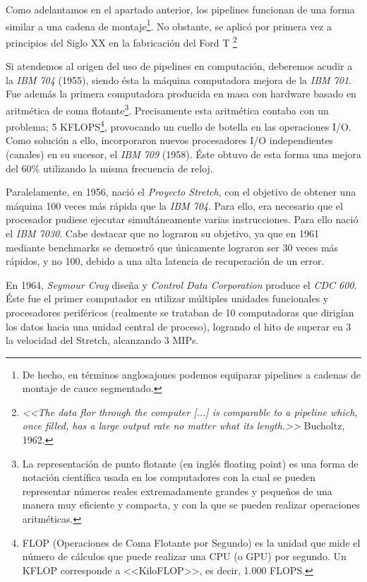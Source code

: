 \documentclass[a4paper, 11pt, titlepage]{article}
\begin{document}
    Como adelantamos en el apartado anterior, los pipelines funcionan de una forma similar a una cadena
    de montaje\footnote{
        De hecho, en términos anglosajones podemos equiparar pipelines a cadenas de montaje de cauce segmentado.
    }. No obstante, se aplicó por primera vez a principios del Siglo XX en la fabricación del 
    Ford T \footnote{
        \textit{<<The data flor through the computer [...] is comparable to a pipeline which, once filled, has a 
        large output rate no matter what its length.>>} Bucholtz, 1962.
    }

    Si atendemos al origen del uso de pipelines en computación, deberemos acudir a la \textit{IBM 704} (1955), 
    siendo ésta la máquina computadora mejora de la \textit{IBM 701}. Fue además la primera computadora producida 
    en masa con hardware basado en aritmética de coma flotante\footnote{
        La representación de punto flotante (en inglés floating point) es una forma de notación científica 
        usada en los computadores con la cual se pueden representar números reales extremadamente grandes y 
        pequeños de una manera muy eficiente y compacta, y con la que se pueden realizar operaciones 
        aritméticas.
    }. Precisamente esta aritmética contaba con un problema; 5 KFLOPS\footnote{
        FLOP (Operaciones de Coma Flotante por Segundo) es la unidad que mide el número de cálculos que puede 
        realizar una CPU (o GPU) por segundo. Un KFLOP corresponde a <<KiloFLOP>>, es decir, 1.000 FLOPS.
    }, provocando un cuello de botella en las operaciones I/O. Como solución a ello, incorporaron nuevos 
    procesadores I/O independientes (canales) en su sucesor, el \textit{IBM 709} (1958). Éste obtuvo de esta 
    forma una mejora del 60\% utilizando la misma frecuencia de reloj.

    Paralelamente, en 1956, nació el \textit{Proyecto Stretch}, con el objetivo de obtener una máquina 100 veces 
    más rápida que la \textit{IBM 704}. Para ello, era necesario que el procesador pudiese ejecutar simultáneamente 
    varias instrucciones. Para ello nació el \textit{IBM 7030}. Cabe destacar que no lograron su objetivo, ya 
    que en 1961 mediante benchmarks se demostró que únicamente lograron ser 30 veces más rápidos, y no 100, 
    debido a una alta latencia de recuperación de un error.
    
    En 1964, \textit{Seymour Cray} diseña y \textit{Control Data Corporation} produce el \textit{CDC 600}. 
    Éste fue el primer computador en utilizar múltiples unidades funcionales y procesadores periféricos (realmente 
    se trataban de 10 computadoras que dirigían los datos hacia una unidad central de proceso), logrando el hito 
    de superar en 3 la velocidad del Stretch, alcanzando 3 MIPs.
\end{document}
